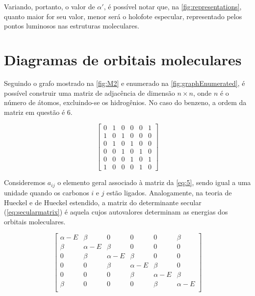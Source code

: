 Variando, portanto, o valor de $\alpha'$, é possível notar que, na \autoref{fig:representations}, quanto maior for seu valor, menor será o holofote especular, representado pelos pontos luminosos nas estruturas moleculares.

\section{Diagramas de orbitais moleculares}

Seguindo o grafo mostrado na \autoref{fig:M2} e enumerado na \autoref{fig:graphEnumerated}, é possível construir uma matriz de adjacência de dimensão $n \times n$, onde $n$ é o número de átomos, excluindo-se os hidrogênios. No caso do benzeno, a ordem da matriz em questão é 6.

\begin{figure}[htb]
\vspace{0.8\baselineskip}
\begin{equation}
\label{eq:adjmatrix}
\begin{bmatrix}
    0 & 1 & 0 & 0 & 0 & 1 \\
    1 & 0 & 1 & 0 & 0 & 0 \\
    0 & 1 & 0 & 1 & 0 & 0 \\
    0 & 0 & 1 & 0 & 1 & 0 \\
    0 & 0 & 0 & 1 & 0 & 1 \\
    1 & 0 & 0 & 0 & 1 & 0
\end{bmatrix}
\end{equation}
\end{figure}

\noindent Consideremos $a_{ij}$ o elemento geral associado à matriz da \autoref{eq:5}, sendo igual a uma unidade quando os carbonos $i$ e $j$ estão ligados. Analogamente, na teoria de Hueckel e de Hueckel estendido, a matriz do determinante secular (\autoref{eq:secularmatrix}) é aquela cujos autovalores determinam as energias dos orbitais moleculares.

\begin{figure}[htb]
\vspace{0.8\baselineskip}
\begin{equation}
\label{eq:secularmatrix}
\begin{bmatrix}
    \alpha - E & \beta & 0 & 0 & 0 & \beta \\
    \beta & \alpha - E & \beta & 0 & 0 & 0 \\
    0 & \beta & \alpha - E & \beta & 0 & 0 \\
    0 & 0 & \beta & \alpha - E & \beta & 0 \\
    0 & 0 & 0 & \beta & \alpha - E & \beta \\
    \beta & 0 & 0 & 0 & \beta & \alpha - E \\
\end{bmatrix}
\end{equation}
\end{figure}


